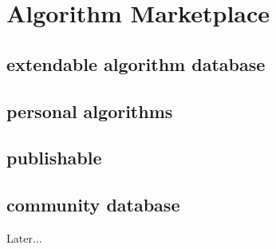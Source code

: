 \section{Algorithm Marketplace}
\label{sect:algo_marketplace}

\subsection{extendable algorithm database}
\label{ssect:algo_db}

\subsection{personal algorithms}
\label{ssect:algo_personal}

\subsection{publishable}
\label{ssect:publishable}

\subsection{community database} Later...
\label{ssect:community_db}
	